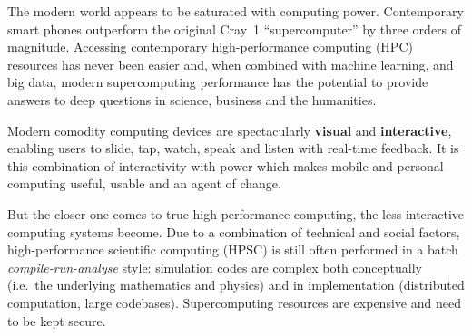 \documentclass[a4paper,fontsize=12pt]{scrartcl}
\begin{document}
The modern world appears to be saturated with computing power.
Contemporary smart phones outperform the original Cray~1
``supercomputer'' by three orders of magnitude. Accessing contemporary
high-performance computing (HPC) resources has never been easier and,
when combined with machine learning\cite{Hastie2009}, and big
data\cite{Manyika2011}, modern supercomputing performance has the
potential to provide answers to deep questions in science, business
and the humanities.

Modern comodity computing devices are spectacularly \textbf{visual}
and \textbf{interactive}, enabling users to slide, tap, watch, speak
and listen with real-time feedback. It is this combination of
interactivity with power which makes mobile and personal computing
useful, usable and an agent of change.

But the closer one comes to true high-performance computing, the less
interactive computing systems become. Due to a combination of
technical and social factors, high-performance scientific computing
(HPSC) is still often performed in a batch \emph{compile-run-analyse}
style: simulation codes are complex both conceptually (i.e.~the
underlying mathematics and physics) and in implementation (distributed
computation, large codebases). Supercomputing resources are expensive
and need to be kept secure.
\end{document}
